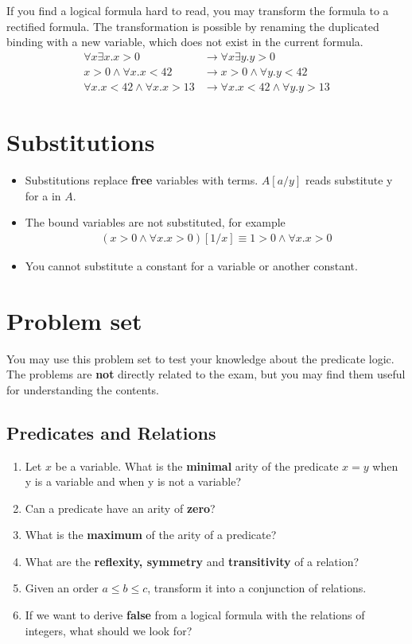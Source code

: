 \documentclass[12pt]{article}
\begin{document}
\begin{enumerate}
\begin{table}[ht]
    \end{table}
    If you find a logical formula hard to read,
    you may transform the formula to a rectified formula. The transformation is possible by renaming the duplicated binding 
    with a new variable, which does not exist in the current formula.
    \begin{align*}
        \forall x \exists x. x > 0 &\longrightarrow \forall x \exists y. y > 0\\
        x > 0 \land \forall x. x < 42 &\longrightarrow x > 0 \land \forall y. y < 42\\
        \forall x. x < 42 \land \forall x. x > 13 &\longrightarrow \forall x. x < 42 \land \forall y. y > 13
    \end{align*}
\end{enumerate}

\section*{Substitutions}
\begin{itemize}
    \item Substitutions replace \textbf{free} variables with terms. $A[a/y]$ reads substitute y for a in $A$.
    \item The bound variables are not substituted, for example
    \begin{align*}
        (x > 0 \land \forall x. x > 0)[1/x] \equiv 1 > 0 \land \forall x.  x > 0
    \end{align*}
    \item You cannot substitute a constant for a variable or another constant.
\end{itemize}

\section*{Problem set}
You may use this problem set to test your knowledge about the predicate logic. The problems are 
\textbf{not} directly related to the exam, but you may find them useful for understanding 
the contents.
\subsection*{Predicates and Relations}
\begin{enumerate}
    \item Let $x$ be a variable. What is the \textbf{minimal} arity of the predicate $x = y$ when y is a variable and when 
    y is not a variable?
    \item Can a predicate have an arity of \textbf{zero}? 
    \item What is the \textbf{maximum} of the arity of a predicate?
    \item What are the \textbf{reflexity, symmetry} and \textbf{transitivity} of a relation?
    \item Given an order $a \leq b \leq c$, transform it into a conjunction of relations.
    \item If we want to derive \textbf{false} from a logical formula with the relations of integers,
    what should we look for?
\end{enumerate}
\end{document}
